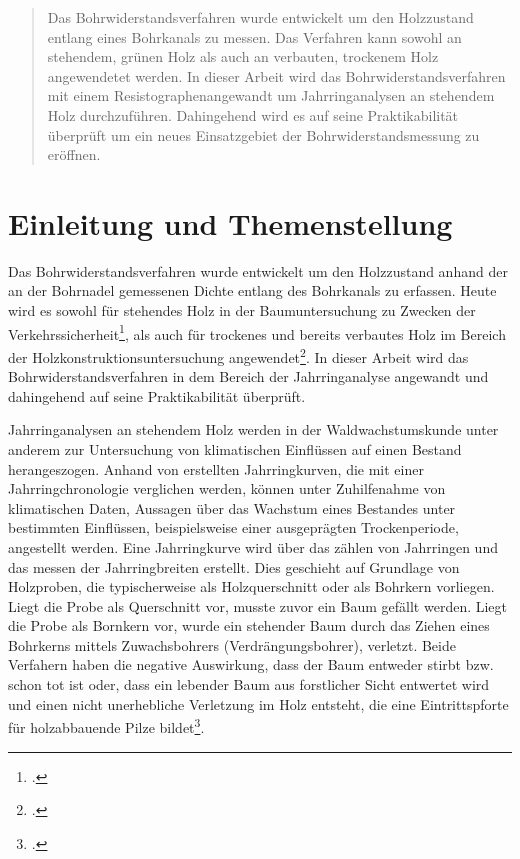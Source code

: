 \documentclass[a4paper, halfparskip]{article}
\def\SymbReg{\textsuperscript{\textregistered}}
\begin{document}
\tableofcontents
\thispagestyle{empty}
\pagebreak

\begin{abstract}
Das Bohrwiderstandsverfahren wurde entwickelt um den Holzzustand entlang eines
Bohrkanals zu messen. Das Verfahren kann sowohl an stehendem, grünen Holz als
auch an verbauten, trockenem Holz angewendetet werden. 
In dieser Arbeit wird das Bohrwiderstandsverfahren mit einem
Resistographen\SymbReg angewandt um Jahrringanalysen an stehendem Holz
durchzuführen. Dahingehend wird es auf seine Praktikabilität überprüft um 
ein neues Einsatzgebiet der Bohrwiderstandsmessung zu eröffnen.
\end{abstract}

\listoffigures

\listoftables

\section{Einleitung und Themenstellung}\label{sec:einleitung}
Das Bohrwiderstandsverfahren wurde entwickelt um den Holzzustand
anhand der an der Bohrnadel gemessenen Dichte entlang des Bohrkanals zu
erfassen. Heute wird es sowohl für stehendes Holz in der Baumuntersuchung zu
Zwecken der Verkehrssicherheit\footcite{rinn:bohrwiderstandsprofile}, als auch
für trockenes und bereits verbautes Holz im Bereich der
Holzkonstruktionsuntersuchung
angewendet\footcite{rinnfischer:zustandskartierung}. In dieser Arbeit wird das
Bohrwiderstandsverfahren in dem Bereich der Jahrringanalyse angewandt und
dahingehend auf seine Praktikabilität überprüft.

Jahrringanalysen an stehendem Holz werden in der Waldwachstumskunde unter
anderem zur Untersuchung von klimatischen Einflüssen auf einen Bestand
herangeszogen. Anhand von erstellten Jahrringkurven, die mit einer
Jahrringchronologie verglichen werden, können unter Zuhilfenahme von
klimatischen Daten, Aussagen über das Wachstum eines Bestandes unter
bestimmten Einflüssen, beispielsweise einer ausgeprägten Trockenperiode,
angestellt werden. Eine Jahrringkurve wird über das zählen von Jahrringen und
das messen der Jahrringbreiten erstellt. Dies geschieht auf Grundlage von
Holzproben, die typischerweise als Holzquerschnitt oder als Bohrkern
vorliegen. Liegt die Probe als Querschnitt vor, musste zuvor ein Baum gefällt
werden. Liegt die Probe als Bornkern vor, wurde ein stehender Baum durch
das Ziehen eines Bohrkerns mittels Zuwachsbohrers (Verdrängungsbohrer),
verletzt. Beide Verfahern haben die negative Auswirkung, dass der Baum
entweder stirbt bzw. schon tot ist oder, dass ein lebender Baum aus
forstlicher Sicht entwertet wird und einen nicht unerhebliche Verletzung
im Holz entsteht, die eine Eintrittspforte für holzabbauende Pilze
bildet\footcite[66]{schweingruber1983jahrring}.
\end{document}

